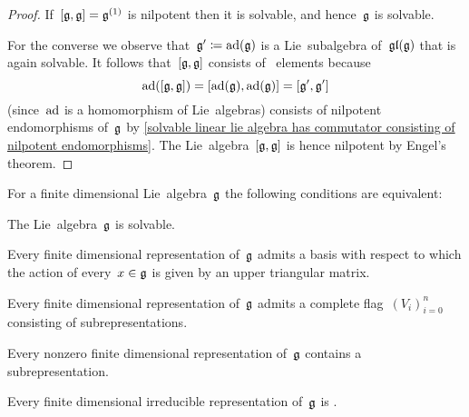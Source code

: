 \begin{proof}
  If~$[\mathfrak{g}, \mathfrak{g}] = \mathfrak{g}^{(1)}$ is nilpotent then it is solvable, and hence~$\mathfrak{g}$ is solvable.
  
  For the converse we observe that~$\mathfrak{g}' \coloneqq \operatorname{ad}(\mathfrak{g})$ is a Lie~subalgebra of~$\mathfrak{gl}(\mathfrak{g})$ that is again solvable.
  It follows that~$[\mathfrak{g}, \mathfrak{g}]$ consists of~{\adnilpotent} elements because
  \[
    \operatorname{ad}([\mathfrak{g}, \mathfrak{g}])
    =
    [\operatorname{ad}(\mathfrak{g}), \operatorname{ad}(\mathfrak{g})]
    =
    [\mathfrak{g}', \mathfrak{g}']
  \]
  (since~$\operatorname{ad}$ is a homomorphism of Lie~algebras) consists of nilpotent endomorphisms of~$\mathfrak{g}$ by \cref{solvable linear lie algebra has commutator consisting of nilpotent endomorphisms}.
  The Lie~algebra~$[\mathfrak{g}, \mathfrak{g}]$ is hence nilpotent by Engel’s theorem.
\end{proof}


\begin{corollary}
  \label{characterization of fd solvable Lie algebras}
  For a finite dimensional Lie~algebra~$\mathfrak{g}$ the following conditions are equivalent:
  \begin{equivalenceslist}
    \item
      \label{g is solvable}
      The Lie~algebra~$\mathfrak{g}$ is solvable.
    \item
      \label{every fd rep is triangularizable}
      Every finite dimensional representation of~$\mathfrak{g}$ admits a basis with respect to which the action of every~$x \in \mathfrak{g}$ is given by an upper triangular matrix.
    \item
      \label{every fd rep admits a complete flag of subreps}
      Every finite dimensional representation of~$\mathfrak{g}$ admits a complete flag~$(V_i)_{i=0}^n$ consisting of subrepresentations.
    \item
      \label{every fd rep contains a one dimensional subrep}
      Every nonzero finite dimensional representation of~$\mathfrak{g}$ contains a {\onedimensional} subrepresentation.
    \item
      \label{every fd irrep is one dimensional}
      Every finite dimensional irreducible representation of~$\mathfrak{g}$ is {\onedimensional}.
  \end{equivalenceslist}
\end{corollary}



